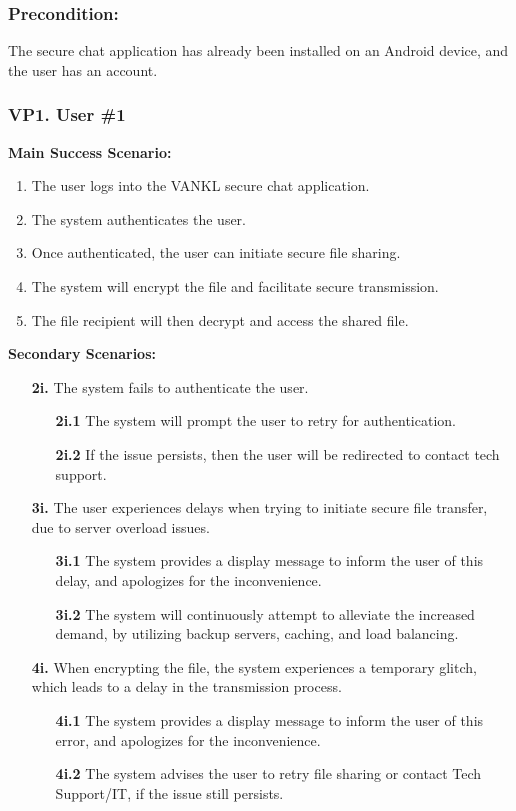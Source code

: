 \documentclass[]{article}
\begin{document}
\subsubsection*{Precondition:} The secure chat application has already been installed on an Android device, and the user has an account.
\subsubsection*{VP1. User \#1}
\textbf{Main Success Scenario:}
\begin{enumerate}
	\item The user logs into the VANKL secure chat application.
	\item The system authenticates the user.
	\item Once authenticated, the user can initiate secure file sharing.
	\item The system will encrypt the file and facilitate secure transmission.
	\item The file recipient will then decrypt and access the shared file.
\end{enumerate}
\textbf{Secondary Scenarios:}
\begin{enumerate}
	\item[\textbf{2i.}] The system fails to authenticate the user.
		\begin{enumerate}
			\item[\textbf{2i.1}] The system will prompt the user to retry for authentication.
			\item[\textbf{2i.2}] If the issue persists, then the user will be redirected to contact tech support.
		\end{enumerate}
	\item[\textbf{3i.}] The user experiences delays when trying to initiate secure file transfer, due to server overload issues.
		\begin{enumerate}
			\item[\textbf{3i.1}] The system provides a display message to inform the user of this delay, and apologizes for the inconvenience.
			\item[\textbf{3i.2}] The system will continuously attempt to alleviate the increased demand, by utilizing backup servers, caching, and load balancing.
		\end{enumerate}
	\item[\textbf{4i.}] When encrypting the file, the system experiences a temporary glitch, which leads to a delay in the transmission process.
		\begin{enumerate}
			\item[\textbf{4i.1}] The system provides a display message to inform the user of this error, and apologizes for the inconvenience.
			\item[\textbf{4i.2}] The system advises the user to retry file sharing or contact Tech Support/IT, if the issue still persists.
		\end{enumerate}
\end{enumerate}
\end{document}
